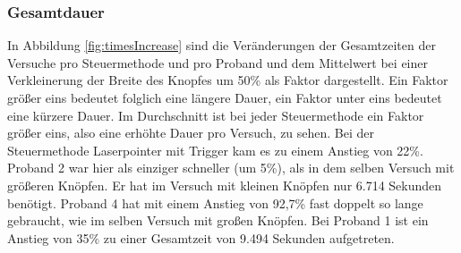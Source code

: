 \subsubsection{Gesamtdauer}
In Abbildung \ref{fig:timesIncrease} sind die Veränderungen der Gesamtzeiten der Versuche pro Steuermethode und pro Proband und dem Mittelwert bei einer Verkleinerung der Breite des Knopfes um 50\% als Faktor dargestellt. Ein Faktor größer eins bedeutet folglich eine längere Dauer, ein Faktor unter eins bedeutet eine kürzere Dauer. Im Durchschnitt ist bei jeder Steuermethode ein Faktor größer eins, also eine erhöhte Dauer pro Versuch, zu sehen. Bei der Steuermethode Laserpointer mit Trigger kam es zu einem Anstieg von 22\%. Proband 2 war hier als einziger schneller (um 5\%), als in dem selben Versuch mit größeren Knöpfen. Er hat im Versuch mit kleinen Knöpfen nur 6.714 Sekunden benötigt. Proband 4 hat mit einem Anstieg von 92,7\% fast doppelt so lange gebraucht, wie im selben Versuch mit großen Knöpfen. Bei Proband 1 ist ein Anstieg von 35\% zu einer Gesamtzeit von 9.494 Sekunden aufgetreten.

